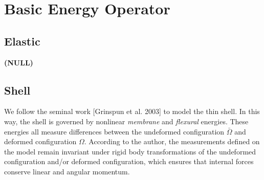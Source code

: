 \documentclass[a4paper,9pt,twocolumn]{extarticle}
\begin{document}
\section{Basic Energy Operator}
\subsection{Elastic}
\textbf{(NULL)}
\subsection{Shell}
We follow the seminal work [Grinspun et al. 2003] to model the thin shell. In this way, the shell is governed by nonlinear \textit{membrane} and \textit{flexural} energies. These energies all measure differences between the undeformed configuration $\bar\Omega$ and deformed configuration $\Omega$. According to the author, the measurements defined on the model remain invariant under rigid body transformations of the undeformed configuration and/or deformed configuration, which ensures that internal forces conserve linear and angular momentum.
\end{document}

